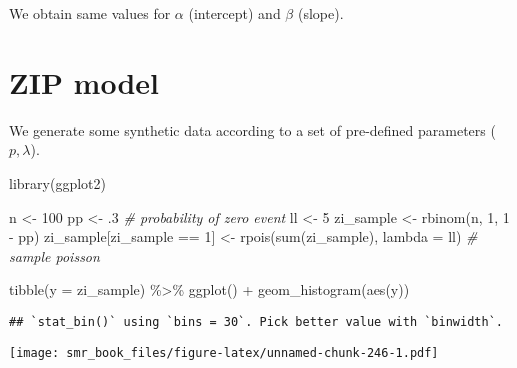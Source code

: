 \documentclass[
  oneside]{book}
\newenvironment{Shaded}{\begin{snugshade}}{\end{snugshade}}
\newcommand{\AttributeTok}[1]{\textcolor[rgb]{0.77,0.63,0.00}{#1}}
\newcommand{\CommentTok}[1]{\textcolor[rgb]{0.56,0.35,0.01}{\textit{#1}}}
\newcommand{\DecValTok}[1]{\textcolor[rgb]{0.00,0.00,0.81}{#1}}
\newcommand{\FunctionTok}[1]{\textcolor[rgb]{0.00,0.00,0.00}{#1}}
\newcommand{\NormalTok}[1]{#1}
\newcommand{\OtherTok}[1]{\textcolor[rgb]{0.56,0.35,0.01}{#1}}
\newcommand{\SpecialCharTok}[1]{\textcolor[rgb]{0.00,0.00,0.00}{#1}}
\begin{document}
We obtain same values for \(\alpha\) (intercept) and \(\beta\) (slope).

\hypertarget{zip-model}{%
\section{ZIP model}\label{zip-model}}

We generate some synthetic data according to a set of
pre-defined parameters (\(p, \lambda\)).

\begin{Shaded}
\begin{Highlighting}[]
\FunctionTok{library}\NormalTok{(ggplot2)}

\NormalTok{n }\OtherTok{\textless{}{-}} \DecValTok{100}
\NormalTok{pp }\OtherTok{\textless{}{-}}\NormalTok{ .}\DecValTok{3} \CommentTok{\# probability of zero event}
\NormalTok{ll }\OtherTok{\textless{}{-}} \DecValTok{5}
\NormalTok{zi\_sample }\OtherTok{\textless{}{-}} \FunctionTok{rbinom}\NormalTok{(n, }\DecValTok{1}\NormalTok{, }\DecValTok{1} \SpecialCharTok{{-}}\NormalTok{ pp)}
\NormalTok{zi\_sample[zi\_sample }\SpecialCharTok{==} \DecValTok{1}\NormalTok{] }\OtherTok{\textless{}{-}} \FunctionTok{rpois}\NormalTok{(}\FunctionTok{sum}\NormalTok{(zi\_sample), }\AttributeTok{lambda =}\NormalTok{ ll) }\CommentTok{\# sample poisson}

\FunctionTok{tibble}\NormalTok{(}\AttributeTok{y =}\NormalTok{ zi\_sample) }\SpecialCharTok{\%\textgreater{}\%}
  \FunctionTok{ggplot}\NormalTok{() }\SpecialCharTok{+}
  \FunctionTok{geom\_histogram}\NormalTok{(}\FunctionTok{aes}\NormalTok{(y))}
\end{Highlighting}
\end{Shaded}

\begin{verbatim}
## `stat_bin()` using `bins = 30`. Pick better value with `binwidth`.
\end{verbatim}

\texttt{[image: smr\_book\_files/figure-latex/unnamed-chunk-246-1.pdf]}
\end{document}
